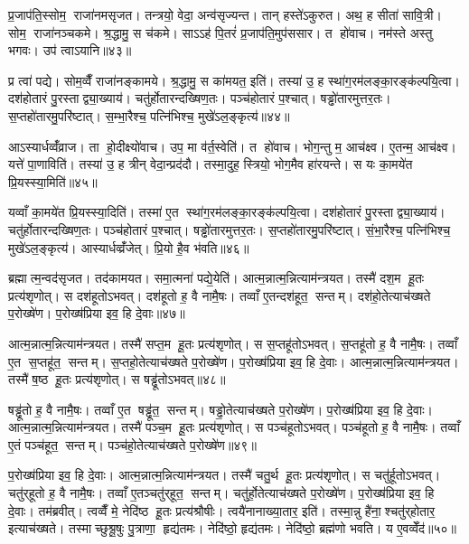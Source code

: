 प्र॒जाप॑ति॒स्सोम॒ राजा॑नमसृजत। तन्त्रयो॒ वेदा॒ अन्व॑सृज्यन्त। तान् हस्ते॑ऽकुरुत। अथ॒ ह सीता॑ सावि॒त्री। सोम॒ राजा॑नञ्चकमे। श्र॒द्धामु॒ स च॑कमे। साऽऽह॑ पि॒तरं॑ प्र॒जाप॑ति॒मुप॑ससार। त हो॑वाच। नम॑स्ते अस्तु भगवः। उप॑ त्वाऽयानि॥४३॥

प्र त्वा॑ पद्ये। सोम॒व्वैँ राजा॑नङ्कामये। श्र॒द्धामु॒ स का॑मयत॒ इति॑। तस्या॑ उ॒ ह स्था॑ग॒रम॑लङ्का॒रङ्क॑ल्पयि॒त्वा। दश॑होतारं पु॒रस्ताद्व्या॒ख्याय॑। चतु॑र्\mbox{}होतारन्दख्षिण॒तः। पञ्च॑होतारं प॒श्चात्। षड्ढो॑तारमुत्तर॒तः। स॒प्तहो॑तारमु॒परि॑ष्टात्। स॒म्भा॒रैश्च॒ पत्नि॑भिश्च॒ मुखे॑ऽल॒ङ्कृत्य॑॥४४॥

आऽस्यार्धव्वँ॑व्राज। ता हो॒दीक्ष्यो॑वाच। उप॒ मा व॑र्त॒स्वेति॑। त हो॑वाच। भोग॒न्तु म॒ आच॑क्ष्व। ए॒तन्म॒ आच॑क्ष्व। यत्ते॑ पा॒णाविति॑। तस्या॑ उ॒ ह त्रीन् वेदा॒न्प्रद॑दौ। तस्मा॒दुह॒ स्त्रियो॒ भोग॒मैव हा॑रयन्ते। स यः का॒मये॑त प्रि॒यस्स्या॒मिति॑॥४५॥

यव्वाँ का॒मये॑त प्रि॒यस्स्या॒दिति॑। तस्मा॑ ए॒त स्था॑ग॒रम॑लङ्का॒रङ्क॑ल्पयि॒त्वा। दश॑होतारं पु॒रस्ताद्व्या॒ख्याय॑। चतु॑र्\mbox{}होतारन्दख्षिण॒तः। पञ्च॑होतारं प॒श्चात्। षड्ढो॑तारमुत्तर॒तः। स॒प्तहो॑तारमु॒परि॑ष्टात्। सं॒भा॒रैश्च॒ पत्नि॑भिश्च॒ मुखे॑ऽल॒ङ्कृत्य॑। आस्यार्धव्व्रँ॑जेत्। प्रि॒यो है॒व भ॑वति॥४६॥\anuvakamend[अ॒या॒न्य॒ल॒ङ्कृत्य॑ स्या॒मिति॑ भवति]

ब्रह्मात्म॒न्वद॑सृजत। तद॑कामयत। समा॒त्मना॑ पद्ये॒येति॑। आत्म॒न्नात्म॒न्नित्याम॑न्त्रयत। तस्मै॑ दश॒म हू॒तः प्रत्य॑शृणोत्। स दश॑हूतोऽभवत्। दश॑हूतो ह॒ वै नामै॒षः। तव्वाँ ए॒तन्दश॑हूत॒ सन्तम्। दश॑हो॒तेत्याच॑ख्षते प॒रोख्षे॑ण। प॒रोख्ष॑प्रिया इव॒ हि दे॒वाः॥४७॥

आत्म॒न्नात्म॒न्नित्याम॑न्त्रयत। तस्मै॑ सप्त॒म हू॒तः प्रत्य॑शृणोत्। स स॒प्तहू॑तोऽभवत्। स॒प्तहू॑तो ह॒ वै नामै॒षः। तव्वाँ ए॒त स॒प्तहू॑त॒ सन्तम्। स॒प्तहो॒तेत्याच॑ख्षते प॒रोख्षे॑ण। प॒रोख्ष॑प्रिया इव॒ हि दे॒वाः। आत्म॒न्नात्म॒न्नित्याम॑न्त्रयत। तस्मै॑ ष॒ष्ठ हू॒तः प्रत्य॑शृणोत्। स षड्ढू॑तोऽभवत्॥४८॥

षड्ढू॑तो ह॒ वै नामै॒षः। तव्वाँ ए॒त षड्ढू॑त॒ सन्तम्। षड्ढो॒तेत्याच॑ख्षते प॒रोख्षे॑ण। प॒रोख्ष॑प्रिया इव॒ हि दे॒वाः। आत्म॒न्नात्म॒न्नित्याम॑न्त्रयत। तस्मै॑ पञ्च॒म हू॒तः प्रत्य॑शृणोत्। स पञ्च॑हूतोऽभवत्। पञ्च॑हूतो ह॒ वै नामै॒षः। तव्वाँ ए॒तं पञ्च॑हूत॒ सन्तम्। पञ्च॑हो॒तेत्याच॑ख्षते प॒रोख्षे॑ण॥४९॥

प॒रोख्ष॑प्रिया इव॒ हि दे॒वाः। आत्म॒न्नात्म॒न्नित्याम॑न्त्रयत। तस्मै॑ चतु॒र्थ हू॒तः प्रत्य॑शृणोत्। स चतु॑र्\mbox{}हूतोऽभवत्। चतु॑र्‌हूतो ह॒ वै नामै॒षः। तव्वाँ ए॒तञ्चतु॑र्‌हूत॒ सन्तम्। चतु॑र्हो॒तेत्याच॑ख्षते प॒रोख्षे॑ण। प॒रोख्ष॑प्रिया इव॒ हि दे॒वाः। तम॑ब्रवीत्। त्वव्वैँ मे॒ नेदि॑ष्ठ हू॒तः प्रत्य॑श्रौषीः। त्वयै॑नानाख्या॒तार॒ इति॑। तस्मा॒न्नु है॑ना॒श्चतु॑र्‌होतार॒ इत्याच॑ख्षते। तस्माच्छुश्रू॒षुः पु॒त्राणा॒ हृद्य॑तमः। नेदि॑ष्ठो॒ हृद्य॑तमः। नेदि॑ष्ठो॒ ब्रह्म॑णो भवति। य ए॒वव्वेँद॑॥५०॥

